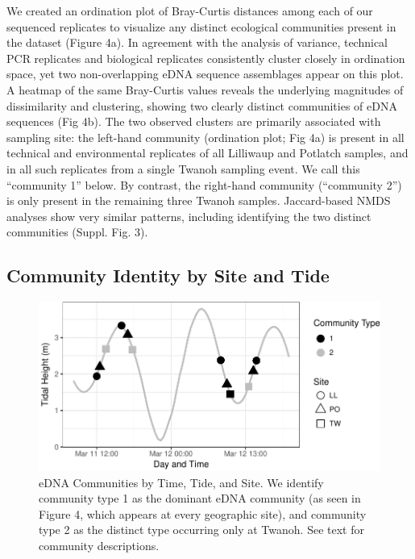 \documentclass[fleqn,10pt,lineno]{wlpeerj} %
\begin{document}
We created an ordination plot of Bray-Curtis distances among each of our
sequenced replicates to visualize any distinct ecological communities
present in the dataset (Figure 4a). In agreement with the analysis of
variance, technical PCR replicates and biological replicates
consistently cluster closely in ordination space, yet two
non-overlapping eDNA sequence assemblages appear on this plot. A heatmap
of the same Bray-Curtis values reveals the underlying magnitudes of
dissimilarity and clustering, showing two clearly distinct communities
of eDNA sequences (Fig 4b). The two observed clusters are primarily
associated with sampling site: the left-hand community (ordination plot;
Fig 4a) is present in all technical and environmental replicates of all
Lilliwaup and Potlatch samples, and in all such replicates from a single
Twanoh sampling event. We call this ``community 1'' below. By contrast,
the right-hand community (``community 2'') is only present in the
remaining three Twanoh samples. Jaccard-based NMDS analyses show very
similar patterns, including identifying the two distinct communities
(Suppl. Fig. 3).

\subsection{Community Identity by Site and
Tide}\label{community-identity-by-site-and-tide-1}

\begin{figure}[!ht]

{\centering \includegraphics{figures/FIG5_tide_community_figure-1} 

}

\caption{\label{fig:fig5}eDNA Communities by Time, Tide, and Site. We identify community type 1 as the dominant eDNA community (as seen in Figure 4, which appears at every geographic site), and community type 2 as the distinct type occurring only at Twanoh. See text for community descriptions.}\label{fig:FIG5_tide_community_figure}
\end{figure}
\end{document}
